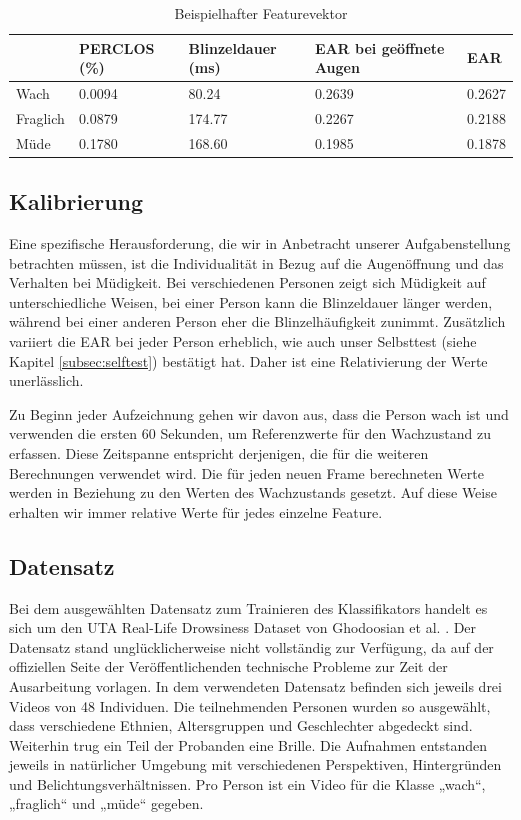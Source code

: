 \begin{table}[!ht]
    \centering
    \begin{tabular}{|l|l|l|l|l|}
    \hline
        ~ & PERCLOS (\%) & Blinzeldauer (ms) & EAR bei geöffnete Augen & EAR \\ \hline
        Wach & 0.0094 & 80.24 & 0.2639 & 0.2627 \\ \hline
        Fraglich & 0.0879 & 174.77 & 0.2267 & 0.2188 \\ \hline
        Müde & 0.1780 & 168.60 & 0.1985 & 0.1878 \\ \hline
    \end{tabular}
\caption{Beispielhafter Featurevektor}
\label{table:featurevector}
\end{table}

\subsection{Kalibrierung}
\label{sec:calibration}

Eine spezifische Herausforderung, die wir in Anbetracht unserer Aufgabenstellung betrachten müssen, ist die Individualität in Bezug auf die Augenöffnung und das Verhalten bei Müdigkeit. Bei verschiedenen Personen zeigt sich Müdigkeit auf unterschiedliche Weisen, bei einer Person kann die Blinzeldauer länger werden, während bei einer anderen Person eher die Blinzelhäufigkeit zunimmt. Zusätzlich variiert die EAR bei jeder Person erheblich, wie auch unser Selbsttest (siehe Kapitel \ref{subsec:selftest}) bestätigt hat. Daher ist eine Relativierung der Werte unerlässlich.

Zu Beginn jeder Aufzeichnung gehen wir davon aus, dass die Person wach ist und verwenden die ersten 60 Sekunden, um Referenzwerte für den Wachzustand zu erfassen. Diese Zeitspanne entspricht derjenigen, die für die weiteren Berechnungen verwendet wird. Die für jeden neuen Frame berechneten Werte werden in Beziehung zu den Werten des Wachzustands gesetzt. Auf diese Weise erhalten wir immer relative Werte für jedes einzelne Feature.


\subsection{Datensatz}
Bei dem ausgewählten Datensatz zum Trainieren des Klassifikators handelt es sich um den UTA Real-Life Drowsiness Dataset von Ghodoosian et al. \cite{GH19}. Der Datensatz stand unglücklicherweise nicht vollständig zur Verfügung, da auf der offiziellen Seite der Veröffentlichenden technische Probleme zur Zeit der Ausarbeitung vorlagen. In dem verwendeten Datensatz befinden sich jeweils drei Videos von 48 Individuen. Die teilnehmenden Personen wurden so ausgewählt, dass verschiedene Ethnien, Altersgruppen und Geschlechter abgedeckt sind. Weiterhin trug ein Teil der Probanden eine Brille. Die Aufnahmen entstanden jeweils in natürlicher Umgebung mit verschiedenen Perspektiven, Hintergründen und Belichtungsverhältnissen. Pro Person ist ein Video für die Klasse „wach“, „fraglich“ und „müde“ gegeben. 

